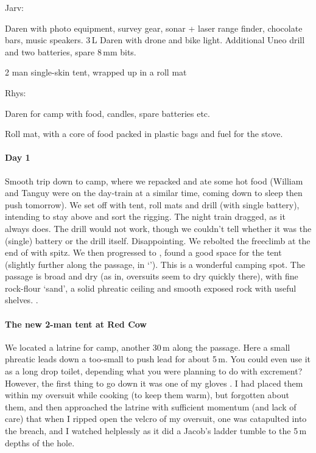 Jarv:
\begin{citemize}
\item Daren with photo equipment, survey gear, sonar + laser range finder, chocolate bars, music speakers. 3\,L Daren with drone and bike light. Additional Uneo drill and two batteries, spare 8\,mm bits.
\item 2 man single-skin tent, wrapped up in a roll mat
\end{citemize}

Rhys:
\begin{citemize}
\item Daren for camp with food, candles, spare batteries etc.
\item Roll mat, with a core of food packed in plastic bags and fuel for the stove.
\end{citemize}


\paragraph{Day 1}
Smooth trip down to camp, where we repacked and ate some hot food (William and Tanguy were on the day-train at a similar time, coming down to sleep then push tomorrow).
We set off with tent, roll mats and drill (with single battery), intending to stay above  and sort the rigging.
The night train dragged, as it always does. The drill would not work, though we couldn't tell whether it was the (single) battery or the drill itself. Disappointing. We rebolted the freeclimb at the end of  with spitz.
We then progressed to , found a good space for the tent (slightly further along the passage, in `'). This is a wonderful camping spot. The passage is broad and dry (as in, oversuits seem to dry quickly there), with fine rock-flour `sand', a solid phreatic ceiling and smooth exposed rock with useful shelves. .

\paragraph{The new 2-man tent at Red Cow} We located a latrine for camp, another 30\,m along the passage. Here a small phreatic leads down a too-small to push lead for about 5\,m. You could even use it as a long drop toilet, depending what you were planning to do with excrement? However, the first thing to go down it was one of my gloves . I had placed them within my oversuit while cooking (to keep them warm), but forgotten about them, and then approached the latrine with sufficient momentum (and lack of care) that when I ripped open the velcro of my oversuit, one was catapulted into the breach, and I watched helplessly as it did a Jacob's ladder tumble to the 5\,m depths of the hole.

